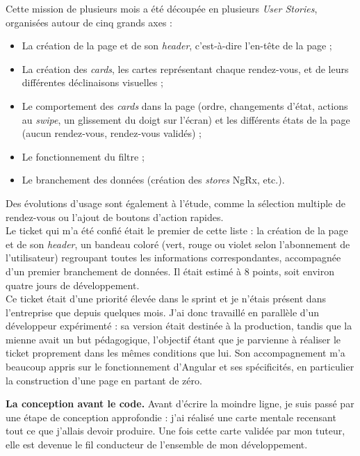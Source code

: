 \documentclass{article}
\begin{document}
Cette mission de plusieurs mois a été découpée en plusieurs \textit{User Stories}, organisées autour de cinq grands axes :

\begin{itemize}
    \item La création de la page et de son \textit{header}, c'est-à-dire l'en-tête de la page ;
    \item La création des \textit{cards}, les cartes représentant chaque rendez-vous, et de leurs différentes déclinaisons visuelles ;
    \item Le comportement des \textit{cards} dans la page (ordre, changements d'état, actions au \textit{swipe}, un glissement du doigt sur l'écran) et les différents états de la page (aucun rendez-vous, rendez-vous validés) ;
    \item Le fonctionnement du filtre ;
    \item Le branchement des données (création des \textit{stores} NgRx, etc.).
\end{itemize}

Des évolutions d'usage sont également à l'étude, comme la sélection multiple de rendez-vous ou l'ajout de boutons d'action rapides.\\

Le ticket qui m'a été confié était le premier de cette liste : la création de la page et de son \textit{header}, un bandeau coloré (vert, rouge ou violet selon l'abonnement de l'utilisateur) regroupant toutes les informations correspondantes, accompagnée d'un premier branchement de données. Il était estimé à 8 points, soit environ quatre jours de développement.\\

Ce ticket était d'une priorité élevée dans le sprint et je n'étais présent dans l'entreprise que depuis quelques mois. J'ai donc travaillé en parallèle d'un développeur expérimenté : sa version était destinée à la production, tandis que la mienne avait un but pédagogique, l'objectif étant que je parvienne à réaliser le ticket proprement dans les mêmes conditions que lui. Son accompagnement m'a beaucoup appris sur le fonctionnement d'Angular et ses spécificités, en particulier la construction d'une page en partant de zéro.

\textbf{La conception avant le code.} Avant d'écrire la moindre ligne, je suis passé par une étape de conception approfondie : j'ai réalisé une carte mentale recensant tout ce que j'allais devoir produire. Une fois cette carte validée par mon tuteur, elle est devenue le fil conducteur de l'ensemble de mon développement.
\end{document}

